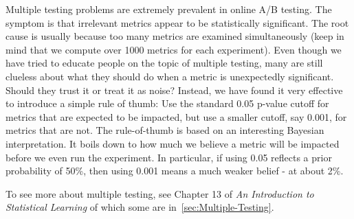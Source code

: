 \begin{description}
Multiple testing problems are extremely prevalent in online A/B testing. 
The symptom is that irrelevant metrics appear to be statistically significant. 
The root cause is usually because too many metrics are examined simultaneously (keep in mind that we compute over 1000 metrics for each experiment). 
Even though we have tried to educate people on the topic of multiple testing, many are still clueless about what they should do when a metric is unexpectedly significant. 
Should they trust it or treat it as noise? Instead, we have found it very effective to introduce a simple rule of thumb: Use the standard 0.05 p-value cutoff for metrics that are expected to be impacted, but use a smaller cutoff, say 0.001, for metrics that are not. 
The rule-of-thumb is based on an interesting Bayesian interpretation. 
It boils down to how much we believe a metric will be impacted before we even run the experiment. 
In particular, if using 0.05 reflects a prior probability of 50\%, then using 0.001 means a much weaker belief - at about 2\%.

To see more about multiple testing, see Chapter 13 of \emph{An Introduction to Statistical Learning}\cite{james2013introduction} of which some are in~\cref{sec:Multiple-Testing}.
\end{description}

